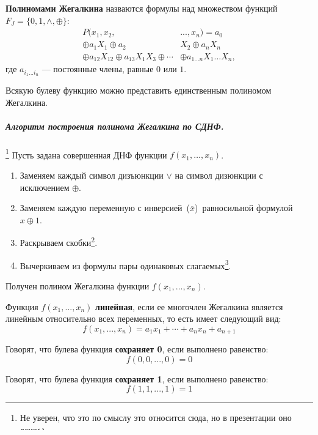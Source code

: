 \documentclass[14pt, a4paper]{extarticle}
\begin{document}
\begin{itemize}
  \begin{defin}
    \textbf{Полиномами Жегалкина} назваются формулы над множеством функций $F_J= \{0, 1, \land, \oplus\}$:
    \begin{align}
    P(x_1, x_2, &..., x_n) = a_0 \\
    \oplus a_1X_1 \oplus a_2&X_2 \oplus a_nX_n \\
    \oplus a_{12}X_{12} \oplus a_{13}X_1X_3 \oplus \cdots& \oplus a_{1\dots n}X_1 \dots X_n,
    \end{align}
    где $a_{i_1...i_n}$ --- постоянные члены, равные $0$ или $1$.
  \end{defin}

  Всякую булеву функцию можно представить единственным полиномом Жегалкина.

  \subparagraph{Алгоритм построения полинома Жегалкина по СДНФ.}\footnote{Не уверен, что это по смыслу это относится сюда, но в презентации оно дано}
    Пусть задана совершенная ДНФ функции $f(x_1, \dots, x_n)$.
    \begin{enumerate}
    \item Заменяем каждый символ дизъюнкции $\lor$ на символ дизюнкции с исключением $\oplus$.
    \item Заменяем каждую переменную с инверсией ($\overline x$) равносильной формулой $x \oplus 1$.
    \item Раскрываем скобки\footnote{Так, как если бы вместо конъюнкции было обычное умножение, а вместо xor'ов --- обычное сложение}.
    \item Вычеркиваем из формулы пары одинаковых слагаемых\footnote{Если в формуле четное число однородных слагаемых, то все уходят. Если нечетное --- отсается одно}.
    \end{enumerate}
    Получен полином Жегалкина функции $f(x_1, \dots, x_n)$.

    \begin{defin}
      Функция $f(x_1, ..., x_n)$ \textbf{линейная}, если ее многочлен Жегалкина является линейным относительно всех переменных, то есть имеет следующий вид:
      $$ f(x_1, ..., x_n) = a_1x_1 + \cdots + a_nx_n + a_{n+1} $$
    \end{defin}

  \begin{defin}
    Говорят, что булева функция \textbf{сохраняет 0}, если выполнено равенство:
    $$ f(0, 0, ..., 0) = 0 $$
  \end{defin}

  \begin{defin}
    Говорят, что булева функция \textbf{сохраняет 1}, если выполнено равенство:
    $$ f(1, 1, ..., 1) = 1 $$
  \end{defin}
\end{itemize}
\end{document}
